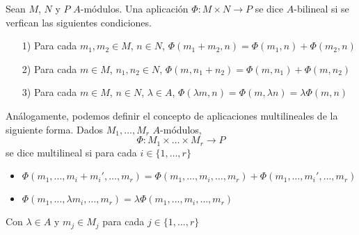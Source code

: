 \documentclass[../main.tex]{subfiles}
\begin{document}
\begin{definition} Sean $M$, $N$ y $P$ $A$-módulos. Una aplicación $\Phi:M\times N\longrightarrow P$ se dice $A$-bilineal si se verfican las siguientes condiciones.
	\begin{itemize}
		\item [1)] Para cada $m_1,m_2\in M$, $n\in N$, $\Phi(m_1+m_2,n)=\Phi(m_1,n)+\Phi(m_2,n)$
		\item [2)] Para cada $m\in M$, $n_1,n_2\in N$, $\Phi(m,n_1+n_2)=\Phi(m,n_1)+\Phi(m,n_2)$
		\item [3)] Para cada $m\in M$, $n\in N$, $\lambda\in A$, $\Phi(\lambda m,n)=\Phi(m,\lambda n)=\lambda\Phi(m,n)$
	\end{itemize}
\end{definition}
\begin{remark} Análogamente, podemos definir el concepto de aplicaciones multilineales de la siguiente forma. Dados $M_1,\dots ,M_r$ $A$-módulos,$$\Phi:M_1\times\dots\times M_r\longrightarrow P$$ se dice multilineal si para cada $i\in\{1,\dots,r\}$\begin{itemize}
		\item $\Phi(m_1,\dots,m_i+m_i',\dots,m_r)=\Phi(m_1,\dots,m_i,\dots,m_r)+\Phi(m_1,\dots,m_i',\dots,m_r)$
		\item $\Phi(m_1,\dots,\lambda m_i,\dots,m_r)=\lambda\Phi(m_1,\dots,m_i,\dots,m_r)$
	\end{itemize}
	Con $\lambda\in A$ y $m_j\in M_j$ para cada $j\in\{1,\dots,r\}$
\end{remark}
\end{document}
